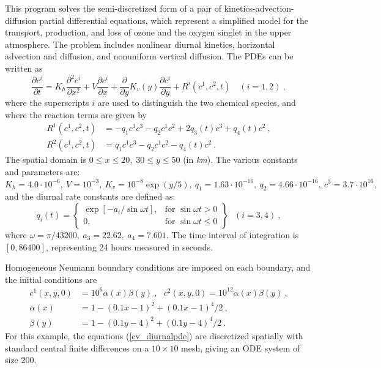 This program solves the semi-discretized form of a pair of
kinetics-advection-diffusion partial differential equations, which
represent a simplified model for the transport, production, and loss
of ozone and the oxygen singlet in the upper atmosphere.  The problem
includes nonlinear diurnal kinetics, horizontal advection and diffusion, 
and nonuniform vertical diffusion.  The PDEs can be written as
\begin{equation}\label{cv_diurnalpde}
  \frac{\partial c^i}{\partial t}=K_h\frac{\partial^2 c^i}{\partial x^2}
  +V \frac{\partial c^i}{\partial x}
  + \frac{\partial} {\partial y} K_v(y) \frac{\partial c^i}{\partial y}
  + R^i(c^1,c^2,t) \quad (i=1,2)~,
\end{equation}
where the superscripts $i$ are used to distinguish the two chemical
species, and where the reaction terms are given by
\begin{equation}\label{e:cv_diurnal:r}
\begin{split}
  R^1(c^1,c^2,t) & = -q_1c^1c^3-q_2c^1c^2+2q_3(t)c^3+q_4(t)c^2 ~, \\
  R^2(c^1,c^2,t) & = q_1c^1c^3-q_2c^1c^2-q_4(t)c^2 ~.
\end{split}
\end{equation}
The spatial domain is $0 \leq x \leq 20,\;30 \leq y \leq 50$ (in {\it km}). 
The various constants and parameters are: $K_h=4.0\cdot 10^{-6},
~ V=10^{-3},~ K_v=10^{-8}\exp (y/5),~ q_1=1.63\cdot 10^{-16},
~ q_2=4.66\cdot 10^{-16},~ c^3=3.7\cdot 10^{16},$ and the diurnal
rate constants are defined as:
\begin{equation*}
q_i(t) = 
\left\{ \begin{array}{ll}
  \exp [-a_i/\sin \omega t], & \mbox{for } \sin \omega t>0 \\
  0, & \mbox{for } \sin \omega t\leq 0
  \end{array} \right\} ~~~(i=3,4) ~,
\end{equation*}
where $\omega =\pi /43200, ~ a_3=22.62,~ a_4=7.601.$  The time interval of
integration is $[0, 86400]$, representing 24 hours measured in seconds.

Homogeneous Neumann boundary conditions are imposed on each boundary, and the
initial conditions are 
\begin{equation} \label{cv_diurnalic}
  \begin{split}
  c^{1}(x,y,0) &= 10^{6}\alpha (x)\beta (y) ~,~~~ 
                    c^{2}(x,y,0)=10^{12}\alpha(x)\beta (y) ~, \\
  \alpha (x) &= 1-(0.1x-1)^{2}+(0.1x-1)^{4}/2 ~, \\
  \beta (y) &= 1-(0.1y-4)^{2}+(0.1y-4)^{4}/2 ~.
  \end{split} 
\end{equation}
For this example, the equations (\ref{cv_diurnalpde}) are discretized spatially
with standard central finite differences on a $10 \times 10$ mesh,
giving an ODE system of size $200$.

